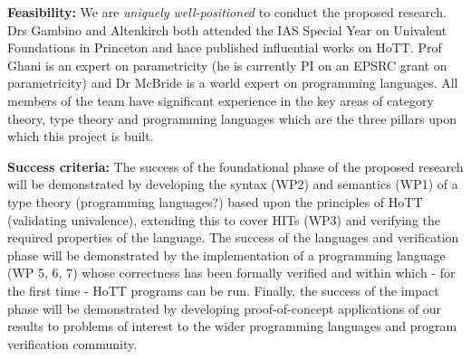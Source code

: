 \documentclass[a4paper,11pt]{article}
\begin{document}
\vspace*{0.02in}

{\bf Feasibility:} We are {\em uniquely well-positioned} to conduct
the proposed research. Drs Gambino and Altenkirch both attended the
IAS Special Year on Univalent Foundations in Princeton and hace
published influential works on HoTT. Prof Ghani is an expert on
parametricity (he is currently PI on an EPSRC grant on parametricity)
and Dr McBride is a world expert on programming languages. All members
of the team have significant experience in the key areas of category
theory, type theory and programming languages which are the three
pillars upon which this project is built.

\vspace*{0.02in}

{\bf Success criteria:} The success of the foundational phase of the proposed
research will be demonstrated by developing the syntax (WP2) and
semantics (WP1) 
of a type theory (programming languages?) based upon the principles of HoTT
(validating univalence), extending this to cover HITs (WP3) and 
verifying the required properties of the language.
The success of the languages and verification phase will be
demonstrated by the implementation of a programming language (WP 5, 6, 7)  whose
correctness has been formally verified and within which - for the
first time - HoTT programs can be run. Finally, the success of the impact phase
will be demonstrated by developing proof-of-concept applications of
our results to problems of interest to the wider programming languages
and program verification community.

\vspace*{0.02in}
\end{document}
